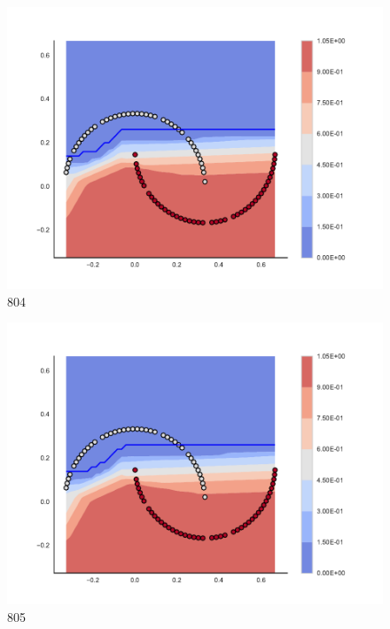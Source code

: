 \begin{subfigure}[b]{0.09\textwidth}
    \includegraphics[clip, trim=2.35cm 1.75cm 4.5cm 0cm,width=\textwidth]{img/convergence/804.pdf}
    \caption{804}
    \label{fig:convergence_804}
\end{subfigure}
%
\begin{subfigure}[b]{0.09\textwidth}
    \includegraphics[clip, trim=2.35cm 1.75cm 4.5cm 0cm,width=\textwidth]{img/convergence/805.pdf}
    \caption{805}
    \label{fig:convergence_805}
\end{subfigure}
%
